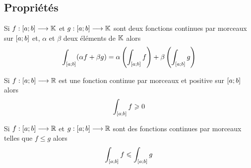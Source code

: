 \subsection{Propriétés}
\begin{defprop}
    Si \(f : \left[a;b\right] \longrightarrow \mathbb{K}\) et \(g : \left[a;b\right] \longrightarrow \mathbb{K}\) sont deux fonctions continues par morceaux sur \(\left[a;b\right]\) et, \(\alpha\) et \(\beta\) deux éléments de \(\mathbb{K}\) alors
    \[ \int_{\left[a;b\right]} (\alpha f + \beta g) = \alpha \left(\int_{\left[a;b\right]} f\right) + \beta \left(\int_{\left[a;b\right]} g\right)\]
\end{defprop}
\begin{defprop}
    Si \(f : \left[a;b\right] \longrightarrow \mathbb{R}\) est une fonction continue par morceaux et positive sur \(\left[a;b\right]\) alors 
    \[ \int_{\left[a;b\right]}f \geqslant 0\]
\end{defprop}
\begin{defprop}
    Si \(f : \left[a;b\right] \longrightarrow \mathbb{R}\) et \(g : \left[a;b\right] \longrightarrow \mathbb{R}\) sont des fonctions continues par morceaux telles que \(f \leq g\) alors
    \[\int_{\left[a;b\right]} f \leqslant \int_{\left[a;b\right]} g\]
\end{defprop}

